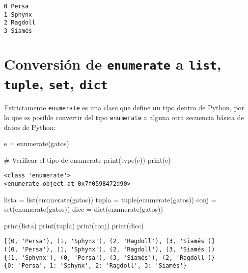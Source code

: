 \documentclass[
  letterpaper,
  DIV=11,
  numbers=noendperiod]{scrreprt}
\newenvironment{Shaded}{\begin{snugshade}}{\end{snugshade}}
\newcommand{\BuiltInTok}[1]{\textcolor[rgb]{0.00,0.23,0.31}{#1}}
\newcommand{\CommentTok}[1]{\textcolor[rgb]{0.37,0.37,0.37}{#1}}
\newcommand{\NormalTok}[1]{\textcolor[rgb]{0.00,0.23,0.31}{#1}}
\newcommand{\OperatorTok}[1]{\textcolor[rgb]{0.37,0.37,0.37}{#1}}
\begin{document}
\begin{verbatim}
0 Persa
1 Sphynx
2 Ragdoll
3 Siamés
\end{verbatim}

\section{\texorpdfstring{Conversión de \texttt{enumerate} a
\texttt{list}, \texttt{tuple}, \texttt{set},
\texttt{dict}}{Conversión de enumerate a list, tuple, set, dict}}\label{conversiuxf3n-de-enumerate-a-list-tuple-set-dict}

Estrictamente \texttt{enumerate} es una clase que define un tipo dentro
de Python, por lo que es posible convertir del tipo \texttt{enumerate} a
alguna otra secuencia básica de datos de Python:

\begin{Shaded}
\begin{Highlighting}[]
\NormalTok{e }\OperatorTok{=} \BuiltInTok{enumerate}\NormalTok{(gatos)}

\CommentTok{\# Verificar el tipo de enumerate}
\BuiltInTok{print}\NormalTok{(}\BuiltInTok{type}\NormalTok{(e))}
\BuiltInTok{print}\NormalTok{(e)}
\end{Highlighting}
\end{Shaded}

\begin{verbatim}
<class 'enumerate'>
<enumerate object at 0x7f0598472d90>
\end{verbatim}

\begin{Shaded}
\begin{Highlighting}[]
\NormalTok{lista }\OperatorTok{=} \BuiltInTok{list}\NormalTok{(}\BuiltInTok{enumerate}\NormalTok{(gatos))}
\NormalTok{tupla }\OperatorTok{=} \BuiltInTok{tuple}\NormalTok{(}\BuiltInTok{enumerate}\NormalTok{(gatos))}
\NormalTok{conj }\OperatorTok{=} \BuiltInTok{set}\NormalTok{(}\BuiltInTok{enumerate}\NormalTok{(gatos))}
\NormalTok{dicc }\OperatorTok{=} \BuiltInTok{dict}\NormalTok{(}\BuiltInTok{enumerate}\NormalTok{(gatos))}

\BuiltInTok{print}\NormalTok{(lista)}
\BuiltInTok{print}\NormalTok{(tupla)}
\BuiltInTok{print}\NormalTok{(conj)}
\BuiltInTok{print}\NormalTok{(dicc)}
\end{Highlighting}
\end{Shaded}

\begin{verbatim}
[(0, 'Persa'), (1, 'Sphynx'), (2, 'Ragdoll'), (3, 'Siamés')]
((0, 'Persa'), (1, 'Sphynx'), (2, 'Ragdoll'), (3, 'Siamés'))
{(1, 'Sphynx'), (0, 'Persa'), (3, 'Siamés'), (2, 'Ragdoll')}
{0: 'Persa', 1: 'Sphynx', 2: 'Ragdoll', 3: 'Siamés'}
\end{verbatim}
\end{document}
